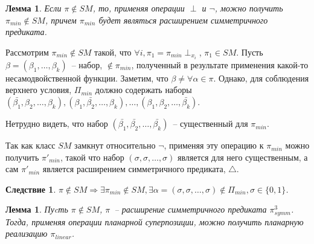 \documentclass[12pt]{article}
\newtheorem{lemma}[theorem]{Лемма}
\newtheorem{corollary}[theorem]{Следствие}
\newenvironment{proof}[1][Доказательство]{\begin{trivlist}
\item[\hskip \labelsep {\bfseries #1}]}{\end{trivlist}}
\begin{document}
\begin{lemma}
\label{eq:lemma_sm}
Если $\pi \notin SM$, то, применяя операции $\perp$ и $\neg$,
можно получить $\pi_{min} \notin SM$, причем $\pi_{min}$ будет являться расширением симметричного предиката.
\end{lemma}

\begin{proof}
Рассмотрим $\pi_{min} \notin SM$ такой, что $\forall i, \pi_1 = \pi_{min} \perp_{x_i}$,
$\pi_1 \in SM$.
Пусть $\beta = (\beta_1, \dots, \beta_k)$~-- набор, $\notin \pi_{min}$, полученный в результате применения какой-то несамодвойственной функции.
Заметим, что $\beta \neq \forall \alpha \in \pi$. Однако, для соблюдения верхнего условия,
$\Pi_{min}$ должно содержать наборы 
$(\bar{\beta_1}, \beta_2, \dots, \beta_k), (\beta_1, \bar{\beta_2}, \dots, \beta_k), \dots, (\beta_1, \beta_2, \dots, \bar{\beta_k})$.

Нетрудно видеть, что набор $(\bar{\beta_1}, \bar{\beta_2}, \dots, \bar{\beta_k})$~-- существенный для $\pi_{min}$.

Так как класс $SM$ замкнут относительно $\neg$, применяя эту операцию к $\pi_{min}$ можно получить $\pi'_{min}$,
такой что набор $(\sigma, \sigma, \dots, \sigma)$ является для него существенным, а сам $\pi'_{min}$ является расширением 
симметричного предиката, $\bigtriangleup$.
\end{proof}

\begin{corollary}
\label{lemma_sm_corollary}
$\pi \notin SM \Longrightarrow \exists \pi_{min} \notin SM, \exists 
\alpha = (\sigma, \sigma, \dots, \sigma) \notin \Pi_{min}, \sigma \in \{0, 1\}$.
\end{corollary}

\begin{lemma}
\label{eq:super_new}
Пуcть $\pi \notin SM$, $\pi$~-- расширение симметричного предиката $\pi_{symm}^3$. 
Тогда, применяя операции планарной суперпозиции, можно получить планарную реализацию $\pi_{linear}$.
\end{lemma}
\end{document}
